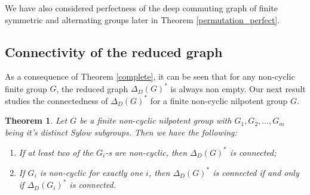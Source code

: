 \documentclass[12pt,a4paper]{article}
\newtheorem{theorem}{Theorem}[section]
\begin{document}
We have also considered perfectness of the deep commuting graph of finite symmetric and alternating groups later in Theorem \ref{permutation_perfect}.

\subsection{Connectivity of the reduced graph}

As a consequence of Theorem \ref{complete}, it can be seen that for any non-cyclic finite group $G$, the reduced graph $\Delta_D(G)^*$ is always non empty. Our next result studies the connectedness of $\Delta_D(G)^*$ for a finite non-cyclic nilpotent group $G$.

\begin{theorem}\label{connectivity_nilpotent}
Let $G$ be a finite non-cyclic nilpotent group with $G_1, G_2, \dots, G_m$ being it's distinct Sylow subgroups. Then we have the following:
\begin{enumerate}[\rm (i)]
    \item If at least two of the $G_i$-s are non-cyclic, then $\Delta_D(G)^*$ is connected;
    \item If $G_i$ is non-cyclic for exactly one $i$, then $\Delta_D(G)^*$ is connected if and only if $\Delta_D(G_i)^*$ is connected.
\end{enumerate}   
\end{theorem}
\end{document}
